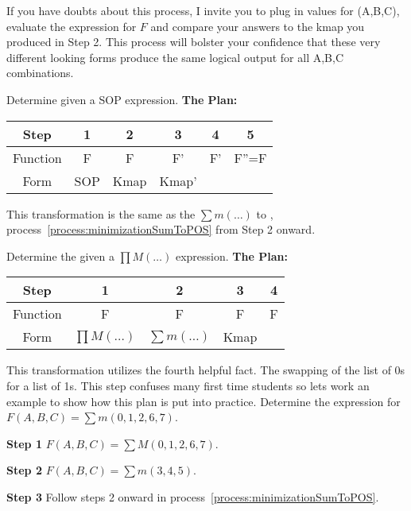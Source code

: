If you have doubts about this process, I invite you to plug in values
for (A,B,C), evaluate the \POSmin expression for $F$ and compare 
your answers to the kmap you produced in Step 2.  This process will
bolster your confidence that these very different looking forms produce
the same logical output for all A,B,C combinations.

\begin{process}{Determine \POSmin given a SOP expression.}
\label{process:minimizationSOPToPOS}
\textbf{The Plan:}

\begin{tabular}{|c|c|c|c|c|c|}\hline
Step	  & 1  & 2  & 3  & 4  & 5  \\ \hline
Function  & F  & F  & F'  & F' &  F''=F \\ \hline
Form	  & SOP & Kmap & Kmap' & \SOPmin & \POSmin \\ \hline
\end{tabular}
\vspace{0.2cm}

This transformation is the same as the $\sum m(\ldots)$ to \POSmin,
process~\ref{process:minimizationSumToPOS} from Step 2 onward.
\end{process}

\begin{process}{Determine the \POSmin given a $\prod M(\ldots)$ expression.}
\label{process:minimizationProdToPOS}
\textbf{The Plan:}

\begin{tabular}{|c|c|c|c|c|}\hline
Step	  & 1  & 2  & 3  & 4     \\ \hline
Function  & F  & F  & F  & F  \\ \hline
Form	  & $\prod M(\ldots)$ & $\sum m(\ldots)$ & Kmap & \SOPmin \\ \hline
\end{tabular}
\vspace{0.2cm}

This transformation utilizes the fourth helpful fact.  The swapping of the
list of 0s for a list of 1s.  This step confuses many first time students so 
lets work an example to show how this plan is put into practice.
Determine the \POSmin expression for $F(A,B,C) = \sum m(0,1,2,6,7)$.

\textbf{Step 1} $F(A,B,C) = \sum M(0,1,2,6,7)$.

\textbf{Step 2} $F(A,B,C) = \sum m(3,4,5)$.

\textbf{Step 3} Follow steps 2 onward in process~\ref{process:minimizationSumToPOS}.
\end{process}



